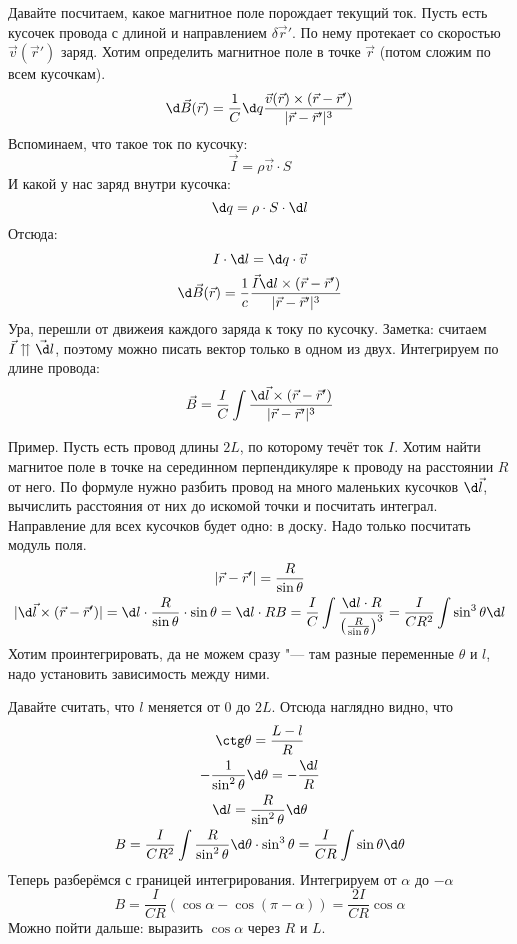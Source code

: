   Давайте посчитаем, какое магнитное поле порождает текущий ток.
  Пусть есть кусочек провода с длиной и направлением $\delta \vec r'$.
  По нему протекает со скоростью $\vec v(\vec r')$ заряд.
  Хотим определить магнитное поле в точке $\vec r$ (потом сложим по всем кусочкам).
  \[ \d \vec B(\vec r) = \frac 1 C \d q \frac{\vec v(\vec r) \times (\vec r - \vec r')}{|\vec r - \vec r'|^3}\]
  Вспоминаем, что такое ток по кусочку:
  \[ \vec I = \rho \vec v \cdot S \]
  И какой у нас заряд внутри кусочка:
  \[ \d q = \rho \cdot S \cdot \d l\]
  Отсюда:
  \begin{gather*}
    I \cdot \d l = \d q \cdot \vec v \\
    \d \vec B(\vec r) = \frac 1 c \frac{\vec I \d l \times (\vec r - \vec r')}{|\vec r - \vec r'|^3}
  \end{gather*}
  Ура, перешли от движеия каждого заряда к току по кусочку.
  Заметка: считаем $\vec I \upuparrows \vec \d l$, поэтому можно писать вектор только в одном из двух.
  Интегрируем по длине провода:
  \[
    \vec B = \frac I C \int \frac{\d \vec l \times (\vec r - \vec r')}{|\vec r - \vec r'|^3}
  \]

  Пример.
  Пусть есть провод длины $2L$, по которому течёт ток $I$.
  Хотим найти магнитое поле в точке на серединном перпендикуляре к проводу на расстоянии $R$ от него.
  По формуле нужно разбить провод на много маленьких кусочков $\d \vec l$,
  вычислить расстояния от них до искомой точки и посчитать интеграл.
  Направление для всех кусочков будет одно: в доску.
  Надо только посчитать модуль поля.
  \begin{gather*}
  | \vec r - \vec r' | = \frac R{\sin \theta} \\
  | \d \vec l \times (\vec r - \vec r') | = \d l \cdot \frac{R}{\sin \theta} \cdot \sin \theta = \d l \cdot R
  B = \frac I C \int \frac{\d l \cdot R}{\left(\frac R{\sin \theta}\right)^3}
    = \frac I {CR^2} \int \sin^3 \theta \d l
  \end{gather*}
  Хотим проинтегрировать, да не можем сразу "--- там разные переменные $\theta$ и $l$, надо установить зависимость между ними.
  
  Давайте считать, что $l$ меняется от $0$ до $2L$.
  Отсюда наглядно видно, что
  \begin{gather*}
    \ctg \theta = \frac{L-l}{R} \\
    - \frac 1 {\sin^2\theta} \d \theta = -\frac{\d l}{R} \\
   \d l = \frac{R}{\sin^2 \theta} \d \theta \\
    B = \frac{I}{CR^2} \int \frac{R}{\sin^2 \theta} \d \theta \cdot \sin^3 \theta
      = \frac{I}{CR} \int \sin \theta \d \theta
  \end{gather*}
  Теперь разберёмся с границей интегрирования.
  Интегрируем от $\alpha$ до $-\alpha$
  \[ B = \frac{I}{CR} (\cos \alpha - \cos(\pi-\alpha)) = \frac{2I}{CR} \cos \alpha\]
  Можно пойти дальше: выразить $\cos \alpha$ через $R$ и $L$.
